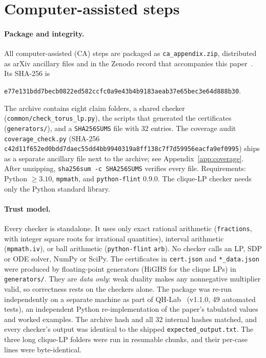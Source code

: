 \documentclass[11pt]{article}
\theoremstyle{definition}
\theoremstyle{remark}
\begin{document}
\section{Computer-assisted steps}\label{app:ca}

\paragraph{Package and integrity.}
All computer-assisted (CA) steps are packaged as \texttt{ca\_appendix.zip}, distributed as arXiv ancillary files and in the Zenodo record that accompanies this paper~\cite{QHLab}.
Its SHA-256 is
\begin{center}\footnotesize\texttt{e77e131bdd7becb0822ed582ccfc0a9e43b4b9183aeab37e65bec3e64d888b30}.\end{center}
The archive contains eight claim folders, a shared checker (\texttt{common/check\_torus\_lp.py}), the scripts that generated the certificates (\texttt{generators/}), and a \texttt{SHA256SUMS} file with 32 entries. The coverage audit \texttt{coverage\_check.py} (SHA-256 \texttt{c42d11f652ed0bdd7daec55dd4bb9940319a8ff138c7f7d59956eacfa9ef0995})
ships as a separate ancillary file next to the archive; see Appendix~\ref{app:coverage}.
After unzipping, \texttt{sha256sum -c SHA256SUMS} verifies every file.
Requirements: Python $\ge3.10$, \texttt{mpmath}, and \texttt{python-flint} 0.9.0. The clique-LP checker needs only the Python standard library.

\paragraph{Trust model.}
Every checker is standalone. It uses only exact rational arithmetic (\texttt{fractions}, with integer square roots for irrational quantities), interval arithmetic (\texttt{mpmath.iv}), or ball arithmetic (\texttt{python-flint} \texttt{arb}).
No checker calls an LP, SDP or ODE solver, NumPy or SciPy.
The certificates in \texttt{cert.json} and \texttt{*\_data.json} were produced by floating-point generators (HiGHS for the clique LPs) in \texttt{generators/}. They are \emph{data only}: weak duality makes any nonnegative multiplier valid, so correctness rests on the checkers alone.
The package was re-run independently on a separate machine as part of QH-Lab~\cite{QHLab} (v1.1.0, 49 automated tests), an independent Python re-implementation of the paper's tabulated values and
worked examples. The archive hash and all 32 internal hashes matched, and every checker's output was identical to the shipped \texttt{expected\_output.txt}. The three long clique-LP folders were run in resumable chunks, and their per-case lines were byte-identical.
\end{document}
